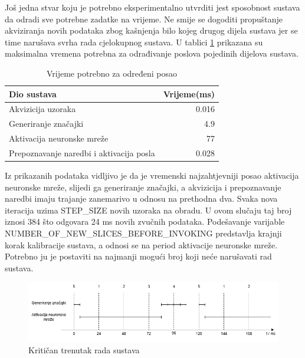 Još jedna stvar koju je potrebno eksperimentalno utvrditi jest sposobnost sustava da
odradi sve potrebne zadatke na vrijeme. Ne smije se dogoditi propuštanje akviziranja
novih podataka zbog kašnjenja bilo kojeg drugog dijela sustava jer se time narušava
svrha rada cjelokupnog sustava. U tablici \ref{tab:rts} prikazana su maksimalna
vremena potrebna za odrađivanje poslova pojedinih dijelova sustava. 

\begin{table}[htb]
    \centering
    \begin{tabular}{|l|r|}
        \hline
        \textbf{Dio sustava} & \textbf{Vrijeme(ms)} \\ \hline
        Akvizicija uzoraka & 0.016\\ \hline
        Generiranje značajki & 4.9 \\ \hline
        Aktivacija neuronske mreže & 77 \\ \hline
        Prepoznavanje naredbi i aktivacija posla & 0.028 \\ \hline
    \end{tabular}
    \caption{Vrijeme potrebno za određeni posao}
    \label{tab:rts}
\end{table}

Iz prikazanih podataka
vidljivo je da je vremenski najzahtjevniji posao aktivacija neuronske mreže, slijedi ga 
generiranje značajki, a akvizicija i prepoznavanje naredbi imaju trajanje zanemarivo u odnosu
na prethodna dva. Svaka nova iteracija uzima STEP\_SIZE novih uzoraka na obradu. U ovom slučaju
taj broj iznosi 384 što odgovara 24 ms novih zvučnih podataka. Podešavanje varijable
NUMBER\_OF\_NEW\_SLICES\_BEFORE\_INVOKING predstavlja krajnji korak kalibracije sustava, a odnosi
se na period aktivacije neuronske mreže.
Potrebno ju je postaviti na najmanji mogući broj koji neće narušavati rad sustava. 

\begin{figure}[htb]
    \centering
    \includegraphics[width=1\linewidth]{Chapters/implementacija/rts.png} 
    \caption{Kritičan trenutak rada sustava}
    \label{pic:rts}
\end{figure}

